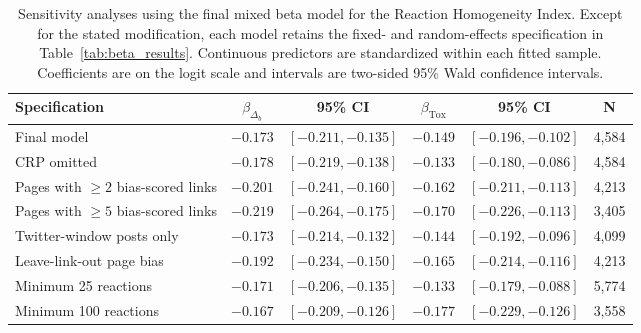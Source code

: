 \begin{table}[htb]
\centering
\footnotesize
\setlength{\tabcolsep}{3pt}
\caption{Sensitivity analyses using the final mixed beta model for the
Reaction Homogeneity Index. Except for the stated modification, each model
retains the fixed- and random-effects specification in
Table~\ref{tab:beta_results}. Continuous predictors are standardized within
each fitted sample. Coefficients are on the logit scale and intervals are
two-sided 95\% Wald confidence intervals.}
\label{tab:robustness_final}
\begin{tabular}{p{3.7cm}ccccc}
\toprule
\textbf{Specification} & $\beta_{\Delta_b}$ & \textbf{95\% CI}
& $\beta_{\mathrm{Tox}}$ & \textbf{95\% CI} & \textbf{N} \\
\midrule
Final model & $-0.173$ & $[-0.211, -0.135]$ & $-0.149$ & $[-0.196, -0.102]$ & 4,584 \\
CRP omitted & $-0.178$ & $[-0.219, -0.138]$ & $-0.133$ & $[-0.180, -0.086]$ & 4,584 \\
Pages with $\geq 2$ bias-scored links & $-0.201$ & $[-0.241, -0.160]$ & $-0.162$ & $[-0.211, -0.113]$ & 4,213 \\
Pages with $\geq 5$ bias-scored links & $-0.219$ & $[-0.264, -0.175]$ & $-0.170$ & $[-0.226, -0.113]$ & 3,405 \\
Twitter-window posts only & $-0.173$ & $[-0.214, -0.132]$ & $-0.144$ & $[-0.192, -0.096]$ & 4,099 \\
Leave-link-out page bias & $-0.192$ & $[-0.234, -0.150]$ & $-0.165$ & $[-0.214, -0.116]$ & 4,213 \\
Minimum 25 reactions & $-0.171$ & $[-0.206, -0.135]$ & $-0.133$ & $[-0.179, -0.088]$ & 5,774 \\
Minimum 100 reactions & $-0.167$ & $[-0.209, -0.126]$ & $-0.177$ & $[-0.229, -0.126]$ & 3,558 \\
\bottomrule
\end{tabular}
\end{table}
